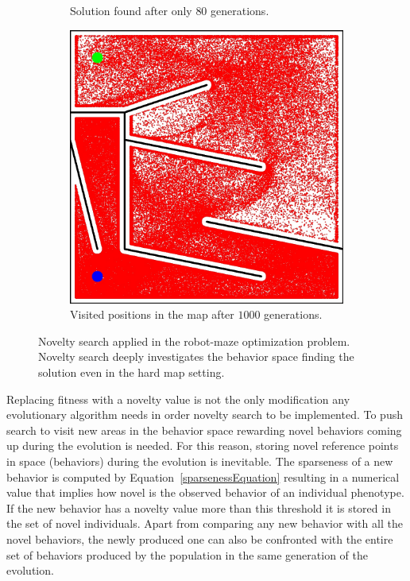 \begin{figure}[t!]
\begin{subfigure}[b]{0.3\textwidth}
\caption{Solution found after only $80$ generations.}
\label{fig:mazeNoveltyHardSolution}
\end{subfigure}\hspace{0.3cm}
\begin{subfigure}[b]{0.3\textwidth}
\includegraphics[width=1.0\textwidth]{../Figures/Misc/MazeHardNovelty.jpg}
\caption{ Visited positions in the map after $1000$ generations.}
\label{fig:mazeNoveltyHard}
\end{subfigure}
\caption{Novelty search applied in the robot-maze optimization problem. Novelty search deeply investigates the behavior space finding the solution even in the hard map setting.}
\label{fig:mazeNovelty}
\end{figure}


Replacing fitness with a novelty value is not the only modification any evolutionary algorithm needs in order novelty search to be implemented. To push search to visit new areas in the behavior space rewarding novel behaviors coming up during the evolution is needed. For this reason, storing novel reference points in space (behaviors) during the evolution is inevitable. The sparseness of a new behavior is computed by Equation~\ref{sparsenessEquation} resulting in a numerical value that implies how novel is the observed behavior of an individual phenotype. If the new behavior has a novelty value more than this threshold it is stored in the set of novel individuals. Apart from comparing any new behavior with all the novel behaviors, the newly produced one can also be confronted with the entire set of behaviors produced by the population in the same generation of the evolution. 

